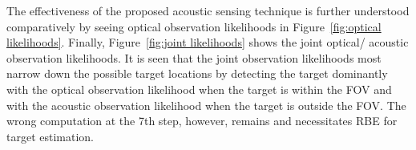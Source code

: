 The effectiveness of the proposed acoustic sensing technique is further understood comparatively by seeing optical observation likelihoods in Figure~{\ref{fig:optical likelihoods}}.    Finally, Figure~\ref{fig:joint likelihoods} shows the joint optical/ acoustic observation likelihoods.  It is seen that the joint observation likelihoods most narrow down the possible target locations by detecting the target dominantly with the optical observation likelihood when the target is within the FOV and with the acoustic observation likelihood when the target is outside the FOV.  The wrong computation at the 7th step, however, remains and necessitates RBE for target estimation.  

